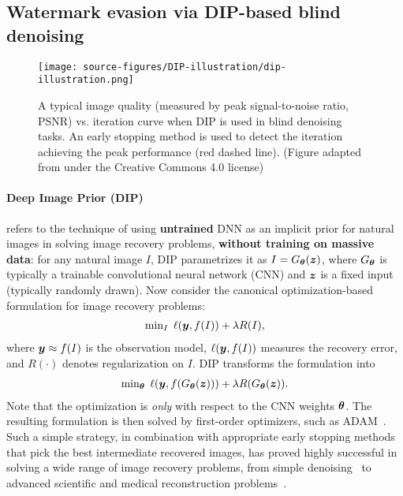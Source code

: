 \subsection{Watermark evasion via DIP-based blind denoising}
\begin{wrapfigure}{r}{0.4\textwidth}
    \vspace{-4em}
    \texttt{[image: source-figures/DIP-illustration/dip-illustration.png]}
    \vspace{-2em}
    \caption{A typical image quality (measured by peak signal-to-noise ratio, PSNR) vs. iteration curve when DIP is used in blind denoising tasks. An early stopping method is used to detect the iteration achieving the peak performance (red dashed line). (Figure adapted from \cite{wang2021early} under the Creative Commons 4.0 license)}
    \label{Fig: DIP demo}
\end{wrapfigure}
\paragraph{Deep Image Prior (DIP)}
\label{subsec: DIP background} refers to the technique of using \textbf{untrained} DNN as an implicit prior for natural images in solving image recovery problems, \textbf{without training on massive data}: for any natural image $I$, DIP parametrizes it as $I = G_{\boldsymbol \theta}(\boldsymbol z)$, where $G_{\boldsymbol \theta}$ is typically a trainable convolutional neural network (CNN) and $\boldsymbol z$ is a fixed input (typically randomly drawn). Now consider the canonical optimization-based formulation for image recovery problems: 
\begin{align}
    \min\nolimits_{I} \; \ell\paren{\mb y, f(I)} + \lambda R(I),  
\end{align}
where $\boldsymbol y \approx f(I)$ is the observation model, $\ell(\boldsymbol y, f(I))$ measures the recovery error, and $R(\cdot)$ denotes regularization on $I$. DIP transforms the formulation into 
\begin{align}
      \min\nolimits_{\mb \theta} \; \ell\paren{\mb y, f(G_{\mb \theta}(\mb z))} + \lambda R(G_{\mb \theta}(\mb z)). 
\end{align}
Note that the optimization is \emph{only} with respect to the CNN weights $\boldsymbol \theta$. The resulting formulation is then solved by first-order optimizers, such as ADAM~\citep{kingma2014adam}. Such a simple strategy, in combination with appropriate early stopping methods~\citep{li2021self,wang2021early,shi2022measuring} that pick the best intermediate recovered images, has proved highly successful in solving a wide range of image recovery problems, from simple denoising~\citep{ulyanov2018deep} to advanced scientific and medical reconstruction problems~\citep{Tirer2023DeepIL,DBLP_journals_pami_QayyumISBBQ23,zhuang2023advancing,zhuang2024blind,zhuang_practical_2023,jdd_doubledip,li_random_2023,li2023deep}.

